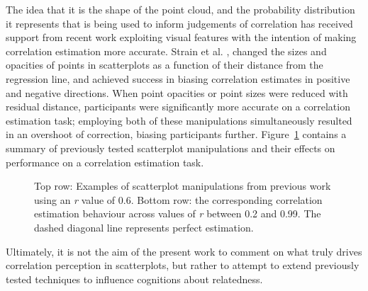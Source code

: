 \documentclass[manuscript,screen,review]{acmart}
\begin{document}
The idea that it is the shape of the point cloud, and the probability
distribution it represents that is being used to inform judgements of
correlation has received support from recent work exploiting visual
features with the intention of making correlation estimation more
accurate. Strain et al. \citep{strain_2023, strain_2023b, strain_2024},
changed the sizes and opacities of points in scatterplots as a function
of their distance from the regression line, and achieved success in
biasing correlation estimates in positive and negative directions. When
point opacities \citep{strain_2023} or point sizes \citep{strain_2023b}
were reduced with residual distance, participants were significantly
more accurate on a correlation estimation task; employing both of these
manipulations simultaneously \citep{strain_2024} resulted in an
overshoot of correction, biasing participants further.
Figure~\ref{fig-previous-manipulations} contains a summary of previously
tested scatterplot manipulations and their effects on performance on a
correlation estimation task.

\begin{figure}


\caption{\label{fig-previous-manipulations}Top row: Examples of
scatterplot manipulations from previous work using an \textit{r} value
of 0.6. Bottom row: the corresponding correlation estimation behaviour
across values of \textit{r} between 0.2 and 0.99. The dashed diagonal
line represents perfect estimation.}

\end{figure}%

Ultimately, it is not the aim of the present work to comment on what
truly drives correlation perception in scatterplots, but rather to
attempt to extend previously tested techniques to influence cognitions
about relatedness.
\end{document}
